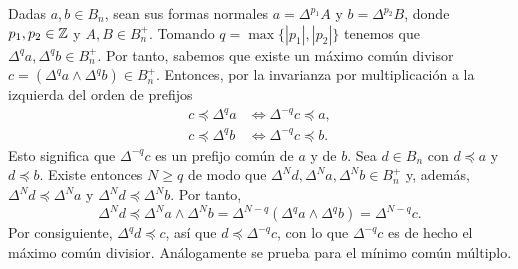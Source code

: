 \documentclass[TFG.tex]{subfiles}
\begin{document}
Dadas $a,b\in B_n$, sean sus formas normales $a=\Delta^{p_1}A$ y $b=\Delta^{p_2}B$, donde $p_1,p_2\in\mathbb{Z}$ y $A,B\in B_n^+$. Tomando $q=\max\{|p_1|,|p_2|\}$ tenemos que $\Delta^qa,\Delta^qb\in B_n^+$. Por tanto, sabemos que existe un máximo común divisor $c=(\Delta^qa\land\Delta^qb)\in B_n^+$. Entonces, por la invarianza por multiplicación a la izquierda del orden de prefijos
\begin{align*}
c\preccurlyeq \Delta^qa &\Leftrightarrow\Delta^{-q}c\preccurlyeq a,\\
c\preccurlyeq \Delta^qb &\Leftrightarrow\Delta^{-q}c\preccurlyeq b.
\end{align*}
Esto significa que $\Delta^{-q}c$ es un prefijo común de $a$ y de $b$. Sea $d\in B_n$ con $d\preccurlyeq a$ y $d\preccurlyeq b$. Existe entonces $N\geq q$ de modo que $\Delta^N d, \Delta^Na, \Delta^N b\in B_n^+$ y, además, $\Delta^N d \preccurlyeq\Delta^Na$ y $\Delta^N d \preccurlyeq\Delta^Nb$. Por tanto, 
$$\Delta^Nd\preccurlyeq \Delta^N a\land\Delta^N b=\Delta^{N-q}(\Delta^qa\land \Delta^qb)=\Delta^{N-q}c.$$
Por consiguiente, $\Delta^{q}d\preccurlyeq c$, así que $d\preccurlyeq \Delta^{-q}c$, con lo que $\Delta^{-q}c$ es de hecho el máximo común divisior. Análogamente se prueba para el mínimo común múltiplo. 


\end{document}
